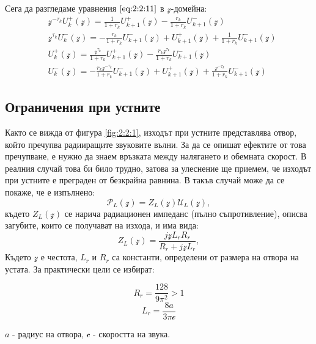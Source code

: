 \documentclass[12pt]{report}
\numberwithin{equation}{section}
\numberwithin{figure}{section}
\begin{document}
    Сега да разгледаме уравнения $\eqref{eq:2:2:11}$ в $\mathcal{z}$-домейна:
    \begin{subequations}
        \label{eq:2:2:12}
        \begin{align}
            & \nonumber \mathcal{z}^{-\tau_k}U_k^{+}(\mathcal{z}) = \frac{1}{1 + r_k} U_{k+1}^{+}(\mathcal{z}) - \frac{r_k}{1+r_k} U_{k+1}^{-}(\mathcal{z}) \\
            & \nonumber \mathcal{z}^{\tau_k} U_k^{-}(\mathcal{z}) = - \frac{r_k}{1+r_k} U_{k+1}^{-}(\mathcal{z}) + U_{k+1}^{+}(\mathcal{z}) + \frac{1}{1 + r_k} U_{k+1}^{-}(\mathcal{z}) \\
            & U_k^{+}(\mathcal{z}) = \frac{\mathcal{z}^{\tau_k}}{1 + r_k} U_{k+1}^{+}(\mathcal{z}) - \frac{r_k\mathcal{z}^{\tau_k}}{1+r_k} U_{k+1}^{-}(\mathcal{z})\\
            & U_k^{-}(\mathcal{z}) = - \frac{r_k\mathcal{z}^{-\tau_k} }{1+r_k} U_{k+1}^{-}(\mathcal{z}) + U_{k+1}^{+}(\mathcal{z}) + \frac{\mathcal{z}^{-\tau_k} }{1 + r_k} U_{k+1}^{-}(\mathcal{z})
        \end{align}
    \end{subequations}

    \subsection{Ограничения при устните}
    Както се вижда от фигура \autoref{fig:2:2:1}, изходът при устните представлява отвор, който
    пречупва радииращите звуковите вълни.
    За да се опишат ефектите от това пречупване, е нужно да знаем връзката между
    налягането и обемната скорост. В реалния случай това би било трудно, затова за улеснение
    ще приемем, че изходът при устните е преграден от безкрайна равнина. В такъв случай може
    да се покаже, че е изпълнено:
    \begin{equation}
        \label{eq:2:2:13}
        \mathcal{P}_L(\mathcal{z}) = Z_L(\mathcal{z}) \mathcal{U}_L(\mathcal{z}),
    \end{equation}
    където 
    $Z_L(\mathcal{z})$ се нарича радиационен импеданс (пълно съпротивление), описва загубите, които се получават на изхода, и има вида:
    \[
        Z_L(\mathcal{z}) = \frac{j\mathcal{z} L_r R_r}{R_r + j\mathcal{z} L_r},    
    \]
    Където $\mathcal{z}$ е честота, $L_r$ и $R_r$ са константи, определени от размера на отвора на устата. За практически цели се избират:

    \begin{multicols}{2}
        \begin{equation*}
          R_r = \frac{128}{9\pi^2} > 1
        \end{equation*}\break
        \begin{equation*}
          L_r = \frac{8a}{3\pi \mathcal{c}}
        \end{equation*}
      \end{multicols}
    $a$ - радиус на отвора, $\mathcal{c}$ - скоростта на звука.
\end{document}
